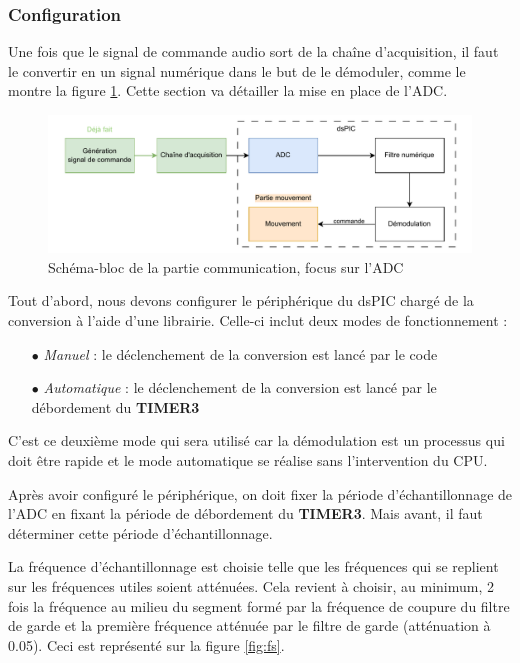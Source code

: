 \subsubsection{Configuration}

Une fois que le signal de commande audio sort de la chaîne d'acquisition, il faut le convertir en un signal numérique dans le but de le démoduler, comme le montre la figure \ref{fig:adcbloc}. Cette section va détailler la mise en place de l'ADC.

\begin{figure}[H]
    \centering
    \includegraphics[scale=0.8]{pdffiles/ADCbloc.drawio.pdf}
    \caption{Schéma-bloc de la partie communication, focus sur l'ADC}
    \label{fig:adcbloc}
\end{figure}

Tout d'abord, nous devons configurer le périphérique du dsPIC chargé de la conversion à l'aide d'une librairie. Celle-ci inclut deux modes de fonctionnement :

\begin{itemize}
    \item [$\bullet$] \textit{Manuel} : le déclenchement de la conversion est lancé par le code
    \item [$\bullet$] \textit{Automatique} : le déclenchement de la conversion est lancé par le débordement du \textbf{TIMER3}
\end{itemize}

C'est ce deuxième mode qui sera utilisé car la démodulation est un processus qui doit être rapide et le mode automatique se réalise sans l'intervention du CPU.

Après avoir configuré le périphérique, on doit fixer la période d'échantillonnage de l'ADC en fixant la période de débordement du \textbf{TIMER3}. Mais avant, il faut déterminer cette période d'échantillonnage.

La fréquence d'échantillonnage est choisie telle que les fréquences qui se replient sur les fréquences utiles soient atténuées. Cela revient à choisir, au minimum, 2 fois la fréquence au milieu du segment formé par la fréquence de coupure du filtre de garde et la première fréquence atténuée par le filtre de garde (atténuation à 0.05). Ceci est représenté sur la figure \ref{fig:fs}.  

